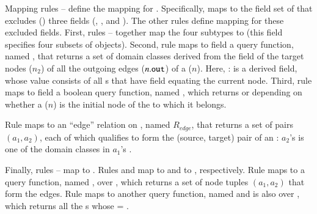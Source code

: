 Mapping rules -- define the mapping for . Specifically,  maps  to the field set of  that excludes () three fields (, , and ). 
The other rules define mapping for these excluded fields. 
%
First, rules -- together map the four  subtypes to  (this field specifies four subsets of  objects). 
%
%
Second, rule  maps to field  a query function, named , that returns a set of domain classes derived from the field  of the target nodes ($ n_2 $) of all the outgoing edges ($ n.{\tt out} $) of a  ($ n $). Here, :  is a derived field, whose value consists of all s that have field  equating the current node.
%
Third, rule  maps to field  a boolean query function, named , which returns  or  depending on whether a  ($ n $) is the initial node of the  to which it belongs.

Rule  maps  to an ``edge'' relation on , named $R_{edge}$, that returns a set of  pairs $ (a_1, a_2) $, each of which qualifies to form the (source, target) pair of an : $a_2$'s  is one of the domain classes in $a_1$'s .

Finally, rules -- map  to . Rules  and  map  to  and  to , respectively. Rule  maps  to a query function, named , over , which returns a set of node tuples $(a_1, a_2)$ that form the edges. Rule  maps  to another query function, named  and is also over , which returns all the s whose  = .

